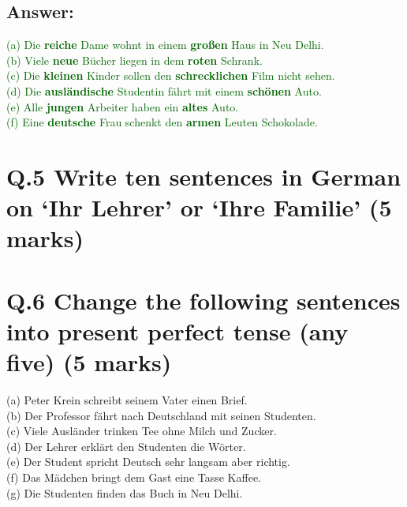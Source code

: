 \documentclass[a4paper,12pt]{article}
\begin{document}
\subsection*{Answer:}
\textcolor{darkgreen}{(a) Die \textbf{reiche} Dame wohnt in einem \textbf{großen} Haus in Neu Delhi.}\\
\textcolor{darkgreen}{(b) Viele \textbf{neue} Bücher liegen in dem \textbf{roten} Schrank.}\\
\textcolor{darkgreen}{(c) Die \textbf{kleinen} Kinder sollen den \textbf{schrecklichen} Film nicht sehen.}\\
\textcolor{darkgreen}{(d) Die \textbf{ausländische} Studentin fährt mit einem \textbf{schönen} Auto.}\\
\textcolor{darkgreen}{(e) Alle \textbf{jungen} Arbeiter haben ein \textbf{altes} Auto.}\\
\textcolor{darkgreen}{(f) Eine \textbf{deutsche} Frau schenkt den \textbf{armen} Leuten Schokolade.}\\

\vspace{0.5cm}

\section*{Q.5 Write ten sentences in German on ‘Ihr Lehrer’ or ‘Ihre Familie’ (5 marks)}

\vspace{0.5cm}

\section*{Q.6 Change the following sentences into present perfect tense (any five) (5 marks)}

(a) Peter Krein schreibt seinem Vater einen Brief.\\
(b) Der Professor fährt nach Deutschland mit seinen Studenten.\\
(c) Viele Ausländer trinken Tee ohne Milch und Zucker.\\
(d) Der Lehrer erklärt den Studenten die Wörter.\\
(e) Der Student spricht Deutsch sehr langsam aber richtig.\\
(f) Das Mädchen bringt dem Gast eine Tasse Kaffee.\\
(g) Die Studenten finden das Buch in Neu Delhi.
\end{document}
